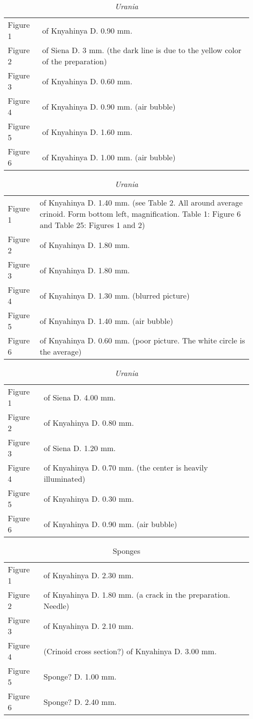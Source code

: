 \documentclass[a4paper, 12pt, oneside]{article}
\begin{document}
\begin{table}[ht!]
\caption{\emph{Urania}}
\centering
\begin{tabular}{ p{2cm} p{10cm} }
\hline
 Figure 1 & of Knyahinya D. 0.90 mm. \\
 Figure 2 & of Siena D. 3 mm. (the dark line is due to the yellow color of the preparation) \\
 Figure 3 & of Knyahinya D. 0.60 mm. \\
 Figure 4 & of Knyahinya D. 0.90 mm. (air bubble) \\
 Figure 5 & of Knyahinya D. 1.60 mm. \\
 Figure 6 & of Knyahinya D. 1.00 mm. (air bubble)
\end{tabular}
\label{table:4}
\end{table}
\begin{table}[ht!]
\caption{\emph{Urania}}
\centering
\begin{tabular}{ p{2cm} p{10cm} }
\hline
 Figure 1 & of Knyahinya D. 1.40 mm. (see Table 2. All around average crinoid. Form bottom left, magnification. Table 1: Figure 6 and Table 25: Figures 1 and 2) \\
 Figure 2 & of Knyahinya D. 1.80 mm. \\
 Figure 3 & of Knyahinya D. 1.80 mm. \\
 Figure 4 & of Knyahinya D. 1.30 mm. (blurred picture) \\
 Figure 5 & of Knyahinya D. 1.40 mm. (air bubble) \\
 Figure 6 & of Knyahinya D. 0.60 mm. (poor picture. The white circle is the average)
\end{tabular}
\label{table:5}
\end{table}
\begin{table}[ht!]
\caption{\emph{Urania}}
\centering
\begin{tabular}{ p{2cm} p{10cm} }
\hline
 Figure 1 & of Siena D. 4.00 mm. \\
 Figure 2 & of Knyahinya D. 0.80 mm. \\
 Figure 3 & of Siena D. 1.20 mm. \\
 Figure 4 & of Knyahinya D. 0.70 mm. (the center is heavily illuminated) \\
 Figure 5 & of Knyahinya D. 0.30 mm. \\
 Figure 6 & of Knyahinya D. 0.90 mm. (air bubble)
\end{tabular}
\label{table:6}
\end{table}
\begin{table}[ht!]
\caption{Sponges}
\centering
\begin{tabular}{ p{2cm} p{10cm} }
\hline
 Figure 1 & of Knyahinya D. 2.30 mm. \\
 Figure 2 & of Knyahinya D. 1.80 mm. (a crack in the preparation. Needle) \\
 Figure 3 & of Knyahinya D. 2.10 mm. \\
 Figure 4 & (Crinoid cross section?) of Knyahinya D. 3.00 mm. \\
 Figure 5 & Sponge? D. 1.00 mm. \\
 Figure 6 & Sponge? D. 2.40 mm.
\end{tabular}
\label{table:7}
\end{table}
\end{document}
